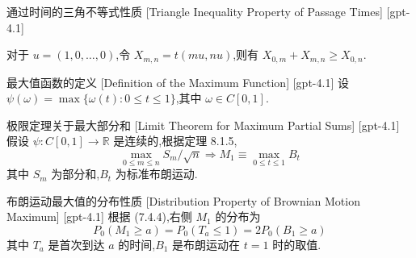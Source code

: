 \documentclass[UTF8]{ctexart}
\begin{document}
    
    
    \begin{ppt}
        {通过时间的三角不等式性质}
        [Triangle Inequality Property of Passage Times]
        [gpt-4.1]
        
对于 $u = (1, 0, \ldots, 0)$,令 $X_{m, n} = t(m u, n u)$,则有 $X_{0, m} + X_{m, n} \geq X_{0, n}$.

    \end{ppt}
    
    
    
    \begin{dfn}
        {最大值函数的定义}
        [Definition of the Maximum Function]
        [gpt-4.1]
        设 $\psi(\omega) = \max\{\omega(t) : 0 \leq t \leq 1\}$,其中 $\omega \in C[0, 1]$.
    \end{dfn}
    
    
    
    \begin{thm}
        {极限定理关于最大部分和}
        [Limit Theorem for Maximum Partial Sums]
        [gpt-4.1]
        假设 $\psi : C[0, 1] \to \mathbb{R}$ 是连续的,根据定理 8.1.5,
\[
\max_{0 \leq m \leq n} S_m / \sqrt{n} \Rightarrow M_1 \equiv \max_{0 \leq t \leq 1} B_t
\]
其中 $S_m$ 为部分和,$B_t$ 为标准布朗运动.
    \end{thm}
    
    
    
    \begin{ppt}
        {布朗运动最大值的分布性质}
        [Distribution Property of Brownian Motion Maximum]
        [gpt-4.1]
        根据 (7.4.4),右侧 $M_1$ 的分布为
\[
P_0(M_1 \geq a) = P_0(T_a \leq 1) = 2P_0(B_1 \geq a)
\]
其中 $T_a$ 是首次到达 $a$ 的时间,$B_1$ 是布朗运动在 $t=1$ 时的取值.
    \end{ppt}
    
    
    
\end{document}

